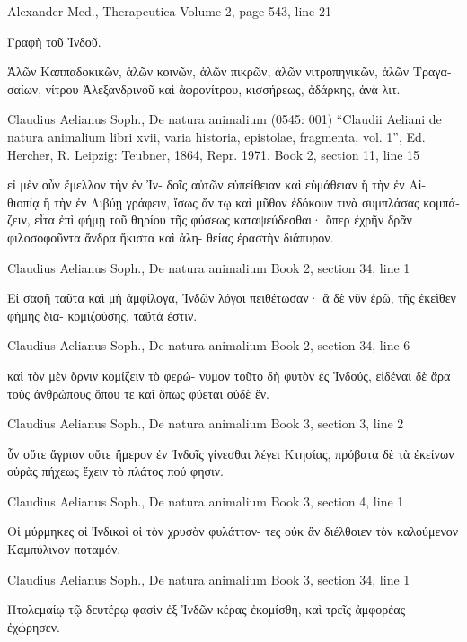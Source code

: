 \documentclass[12pt,letterpaper,twoside,final]{memoir}
\begin{document}
\begin{greek}
Alexander Med., Therapeutica 
Volume 2, page 543, line 21

     
Γραφὴ τοῦ Ἰνδοῦ.


 Ἁλῶν Καππαδοκικῶν, ἁλῶν κοινῶν, ἁλῶν πικρῶν, ἁλῶν νιτροπηγικῶν, 
ἁλῶν Τραγασαίων, νίτρου Ἀλεξανδρινοῦ καὶ ἀφρονίτρου, κισσήρεως, 
ἀδάρκης, ἀνὰ λιτ. 



Claudius Aelianus Soph., De natura animalium (0545: 001)
“Claudii Aeliani de natura animalium libri xvii, varia historia, epistolae, fragmenta, vol. 1”, Ed. Hercher, R.
Leipzig: Teubner, 1864, Repr. 1971.
Book 2, section 11, line 15

                      εἰ μὲν οὖν ἔμελλον τὴν ἐν Ἰν-
δοῖς αὐτῶν εὐπείθειαν καὶ εὐμάθειαν ἢ τὴν ἐν Αἰ-
θιοπίᾳ ἢ τὴν ἐν Λιβύῃ γράφειν, ἴσως ἄν τῳ καὶ 
μῦθον ἐδόκουν τινὰ συμπλάσας κομπάζειν, εἶτα ἐπὶ 
φήμῃ τοῦ θηρίου τῆς φύσεως καταψεύδεσθαι· ὅπερ 
ἐχρῆν δρᾶν φιλοσοφοῦντα ἄνδρα ἥκιστα καὶ ἀλη-
θείας ἐραστὴν διάπυρον. 



Claudius Aelianus Soph., De natura animalium 
Book 2, section 34, line 1

Εἰ σαφῆ ταῦτα καὶ μὴ ἀμφίλογα, Ἰνδῶν λόγοι 
πειθέτωσαν· ἃ δὲ νῦν ἐρῶ, τῆς ἐκεῖθεν φήμης δια-
κομιζούσης, ταῦτά ἐστιν. 



Claudius Aelianus Soph., De natura animalium 
Book 2, section 34, line 6

                 καὶ τὸν μὲν ὄρνιν κομίζειν τὸ φερώ-
νυμον τοῦτο δὴ φυτὸν ἐς Ἰνδούς, εἰδέναι δὲ ἄρα 
τοὺς ἀνθρώπους ὅπου τε καὶ ὅπως φύεται οὐδὲ ἕν. 



Claudius Aelianus Soph., De natura animalium 
Book 3, section 3, line 2

                                                    ὗν   
οὔτε ἄγριον οὔτε ἥμερον ἐν Ἰνδοῖς γίνεσθαι λέγει 
Κτησίας, πρόβατα δὲ τὰ ἐκείνων οὐρὰς πήχεως ἔχειν 
τὸ πλάτος πού φησιν. 



Claudius Aelianus Soph., De natura animalium 
Book 3, section 4, line 1

Οἱ μύρμηκες οἱ Ἰνδικοὶ οἱ τὸν χρυσὸν φυλάττον-
τες οὐκ ἂν διέλθοιεν τὸν καλούμενον Καμπύλινον 
ποταμόν. 



Claudius Aelianus Soph., De natura animalium 
Book 3, section 34, line 1

Πτολεμαίῳ τῷ δευτέρῳ φασὶν ἐξ Ἰνδῶν κέρας 
ἐκομίσθη, καὶ τρεῖς ἀμφορέας ἐχώρησεν. 




\end{greek}
\end{document}
